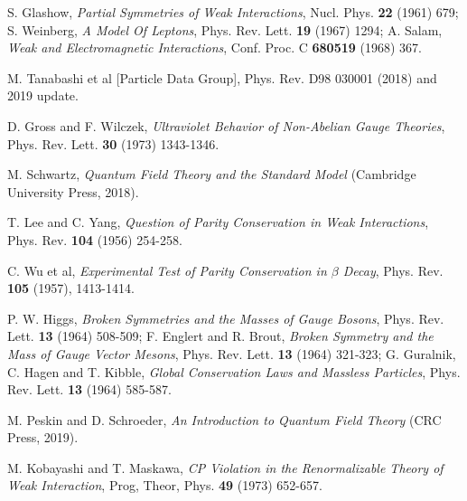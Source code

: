 \documentclass[a4paper,12pt]{article}
\begin{document}
\begin{thebibliography}{99}

S. Glashow, \emph{Partial Symmetries of Weak Interactions}, Nucl. Phys. \textbf{22} (1961) 679; S. Weinberg, \emph{A Model Of Leptons}, Phys. Rev. Lett. \textbf{19} (1967) 1294; A. Salam, \emph{Weak and Electromagnetic Interactions}, Conf. Proc. C \textbf{680519} (1968) 367.

M. Tanabashi et al [Particle Data Group], Phys. Rev. D98 030001 (2018) and 2019 update.

D. Gross and F. Wilczek, \emph{Ultraviolet Behavior of Non-Abelian Gauge Theories}, Phys. Rev. Lett. \textbf{30} (1973) 1343-1346.%


M. Schwartz, \emph{Quantum Field Theory and the Standard Model} (Cambridge University Press, 2018).


T. Lee and C. Yang, \emph{Question of Parity Conservation in Weak Interactions}, Phys. Rev. \textbf{104} (1956) 254-258.%

C. Wu et al, \emph{Experimental Test of Parity Conservation in $\beta$ Decay}, Phys. Rev. \textbf{105} (1957), 1413-1414.%

P. W. Higgs, \emph{Broken Symmetries and the Masses of Gauge Bosons}, Phys. Rev. Lett. \textbf{13} (1964) 508-509; F. Englert and R. Brout, \emph{Broken Symmetry and the Mass of Gauge Vector Mesons}, Phys. Rev. Lett. \textbf{13} (1964) 321-323; G. Guralnik, C. Hagen and T. Kibble, \emph{Global Conservation Laws and Massless Particles}, Phys. Rev. Lett. \textbf{13} (1964) 585-587.


M. Peskin and D. Schroeder, \emph{An Introduction to Quantum Field Theory} (CRC Press, 2019).

M. Kobayashi and T. Maskawa, \emph{CP Violation in the Renormalizable Theory of Weak Interaction}, Prog, Theor, Phys. \textbf{49} (1973) 652-657.%


\end{thebibliography}
\end{document}
